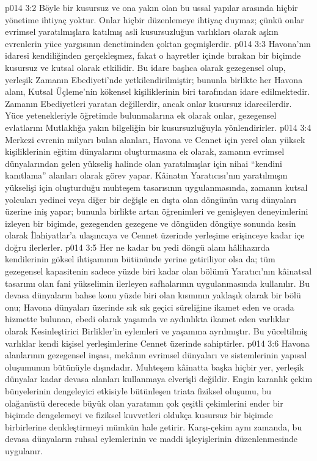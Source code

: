 \vs p014 3:2 Böyle bir kusursuz ve ona yakın olan bu ussal yapılar arasında hiçbir yönetime ihtiyaç yoktur. Onlar hiçbir düzenlemeye ihtiyaç duymaz; çünkü onlar evrimsel yaratılmışlara katılmış asli kusursuzluğun varlıkları olarak aşkın evrenlerin yüce yargısının denetiminden çoktan geçmişlerdir.
\vs p014 3:3 Havona’nın idaresi kendiliğinden gerçekleşmez, fakat o hayretler içinde bırakan bir biçimde kusursuz ve kutsal olarak etkilidir. Bu idare başlıca olarak gezegensel olup, yerleşik Zamanın Ebediyeti’nde yetkilendirilmiştir; bununla birlikte her Havona alanı, Kutsal Üçleme’nin kökensel kişiliklerinin biri tarafından idare edilmektedir. Zamanın Ebediyetleri yaratan değillerdir, ancak onlar kusursuz idarecilerdir. Yüce yetenekleriyle öğretimde bulunmalarına ek olarak onlar, gezegensel evlatlarını Mutlaklığa yakın bilgeliğin bir kusursuzluğuyla yönlendirirler.
\vs p014 3:4 Merkezi evrenin milyarı bulan alanları, Havona ve Cennet için yerel olan yüksek kişiliklerinin eğitim dünyalarını oluşturmasına ek olarak, zamanın evrimsel dünyalarından gelen yükseliş halinde olan yaratılmışlar için nihai “kendini kanıtlama” alanları olarak görev yapar. Kâinatın Yaratıcısı’nın yaratılmışın yükselişi için oluşturduğu muhteşem tasarısının uygulanmasında, zamanın kutsal yolcuları yedinci veya diğer bir değişle en dışta olan döngünün varış dünyaları üzerine iniş yapar; bununla birlikte artan öğrenimleri ve genişleyen deneyimlerini izleyen bir biçimde, gezegenden gezegene ve döngüden döngüye sonunda kesin olarak İlahiyatlar’a ulaşıncaya ve Cennet üzerinde yerleşime erişinceye kadar içe doğru ilerlerler.
\vs p014 3:5 Her ne kadar bu yedi döngü alanı hâlihazırda kendilerinin göksel ihtişamının bütününde yerine getiriliyor olsa da; tüm gezegensel kapasitenin sadece yüzde biri kadar olan bölümü Yaratıcı’nın kâinatsal tasarımı olan fani yükselimin ilerleyen safhalarının uygulanmasında kullanılır. Bu devasa dünyaların bahse konu yüzde biri olan kısmının yaklaşık olarak bir bölü onu; Havona dünyaları üzerinde sık sık geçici süreliğine ikamet eden ve orada hizmette bulunan, ebedi olarak yaşamda ve aydınlıkta ikamet eden varlıklar olarak Kesinleştirici Birlikler’in eylemleri ve yaşamına ayrılmıştır. Bu yüceltilmiş varlıklar kendi kişisel yerleşimlerine Cennet üzerinde sahiptirler.
\vs p014 3:6 Havona alanlarının gezegensel inşası, mekânın evrimsel dünyaları ve sistemlerinin yapısal oluşumunun bütünüyle dışındadır. Muhteşem kâinatta başka hiçbir yer, yerleşik dünyalar kadar devasa alanları kullanmaya elverişli değildir. Engin karanlık çekim bünyelerinin dengeleyici etkisiyle bütünleşen triata fiziksel oluşumu, bu olağanüstü derecede büyük olan yaratımın çok çeşitli çekimlerini ender bir biçimde dengelemeyi ve fiziksel kuvvetleri oldukça kusursuz bir biçimde birbirlerine denkleştirmeyi mümkün hale getirir. Karşı\hyp{}çekim aynı zamanda, bu devasa dünyaların ruhsal eylemlerinin ve maddi işleyişlerinin düzenlenmesinde uygulanır.
